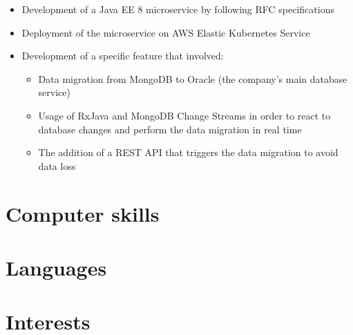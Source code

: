 \documentclass[11pt,a4paper,sans]{moderncv} %
\begin{document}
{\begin{itemize}
\begin{itemize}
            \item Development of a Java EE 8 microservice by following RFC specifications
            \item Deployment of the microservice on AWS Elastic Kubernetes Service
            \item Development of a specific feature that involved:
            \begin{itemize}
                \item Data migration from MongoDB to Oracle (the company's main database service)
                \item Usage of RxJava and MongoDB Change Streams in order to react to database changes and perform the data migration in real time
                \item The addition of a REST API that triggers the data migration to avoid data loss
            \end{itemize}
        \end{itemize}
\end{itemize}}


\section{Computer skills}



\section{Languages}



\section{Interests}

\renewcommand{\listitemsymbol}{-~} %


\end{document}
